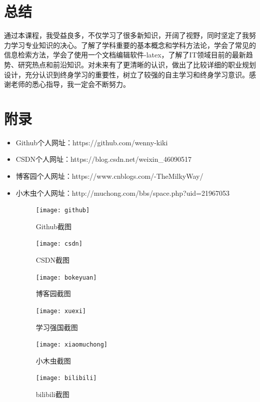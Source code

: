 \documentclass{article}
\begin{document}
\section{总结}
通过本课程，我受益良多，不仅学习了很多新知识，开阔了视野，同时坚定了我努力学习专业知识的决心。了解了学科重要的基本概念和学科方法论，学会了常见的信息检索方法，学会了使用一个文档编辑软件-latex，了解了IT领域目前的最新趋势、研究热点和前沿知识。对未来有了更清晰的认识，做出了比较详细的职业规划设计，充分认识到终身学习的重要性，树立了较强的自主学习和终身学习意识。感谢老师的悉心指导，我一定会不断努力。\par


\section{附录}
\begin{itemize}
    \item Github个人网址：https://github.com/wenny-kiki
    \item CSDN个人网址：https://blog.csdn.net/weixin\_46090517
    \item 博客园个人网址：https://www.cnblogs.com/-TheMilkyWay/
    \item 小木虫个人网址：http://muchong.com/bbs/space.php?uid=21967053

\begin{figure}[h!]
	\centering
	\texttt{[image: github]}
	\caption{Github截图}
	\label{fig:universe}
\end{figure}
\begin{figure}[h!]
	\centering
	\texttt{[image: csdn]}
	\caption{CSDN截图}
	\label{fig:csdn}
\end{figure}
\begin{figure}[h!]
	\centering
	\texttt{[image: bokeyuan]}
	\caption{博客园截图}
	\label{fig:universe}
\end{figure}
\begin{figure}[h!]
\centering
\texttt{[image: xuexi]}
\caption{学习强国截图}
\label{fig:universe}
\end{figure}
\begin{figure}[h!]
	\centering
	\texttt{[image: xiaomuchong]}
	\caption{小木虫截图}
	\label{fig:universe}
\end{figure}


\begin{figure}[h!]
	\centering
	\texttt{[image: bilibili]}
	\caption{bilibili截图}
	\label{fig:universe}
\end{figure}
\end{itemize}

\hspace*{\fill} \\


\end{document}
